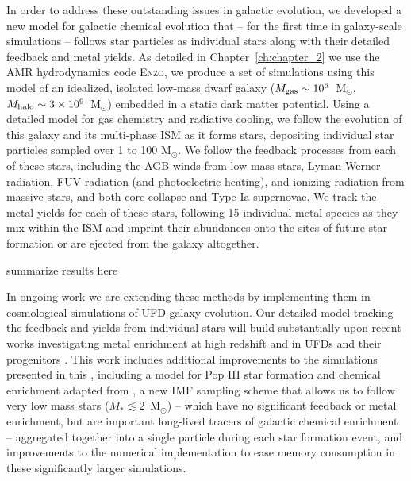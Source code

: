 In order to address these outstanding issues in galactic evolution, we developed a new model for galactic chemical evolution that -- for the first time in galaxy-scale simulations -- follows star particles as individual stars along with their detailed feedback and metal yields. As detailed in Chapter~\ref{ch:chapter_2} we use the AMR hydrodynamics code \textsc{Enzo}, we produce a set of simulations using this model of an idealized, isolated low-mass dwarf galaxy ($M_{\rm gas} \sim 10^{6}$~M$_{\odot}$, $M_{\rm halo} \sim 3 \times 10^{9}$~M$_{\odot}$) embedded in a static dark matter potential. Using a detailed model for gas chemistry and radiative cooling, we follow the evolution of this galaxy and its multi-phase ISM as it forms stars, depositing individual star particles sampled over 1 to 100 M$_{\odot}$. We follow the feedback processes from each of these stars, including the AGB winds from low mass stars, Lyman-Werner radiation, FUV radiation (and photoelectric heating), and ionizing radiation from massive stars, and both core collapse and Type Ia supernovae. We track the metal yields for each of these stars, following 15 individual metal species as they mix within the ISM and imprint their abundances onto the sites of future star formation or are ejected from the galaxy altogether.

summarize results here

In ongoing work we are extending these methods by implementing them in cosmological simulations of UFD galaxy evolution. Our detailed model tracking the feedback and yields from individual stars will build substantially upon recent works investigating metal enrichment at high redshift and in UFDs and their progenitors \citep[e.g.][]{Ritter2015,Jeon2017,Corlies2018}. This work includes additional improvements to the simulations presented in this \dissertation, including a model for Pop III star formation and chemical enrichment adapted from \cite{Wise2012a}, a new IMF sampling scheme that allows us to follow very low mass stars ($M_* \lesssim 2$~M$_{\odot}$) -- which have no significant feedback or metal enrichment, but are important long-lived tracers of galactic chemical enrichment -- aggregated together into a single particle during each star formation event, and improvements to the numerical implementation to ease memory consumption in these significantly larger simulations.

